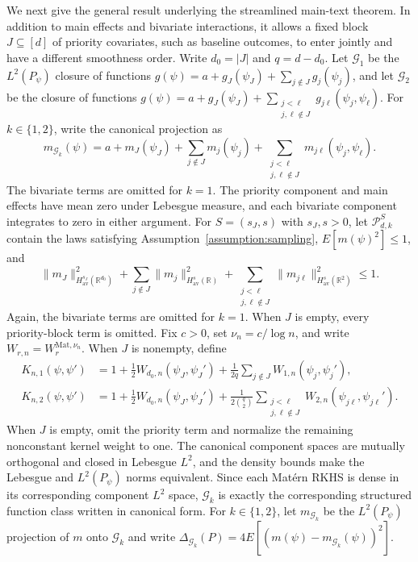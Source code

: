 \documentclass[letterpaper,12pt]{article}
\theoremstyle{definition}
\numberwithin{equation}{section}
\newcommand{\mr}{\mathbb{R}}
\newcommand{\mc}{\mathcal}
\newcommand{\norm}[1]{\lVert#1\rVert}
\begin{document}
We next give the general result underlying the streamlined main-text theorem.
In addition to main effects and bivariate interactions, it allows a fixed block $J\subseteq[d]$ of priority covariates, such as baseline outcomes, to enter jointly and have a different smoothness order.
Write $d_0=|J|$ and $q=d-d_0$.
Let $\mc G_1$ be the $L^2(P_\psi)$ closure of functions $g(\psi)=a+g_J(\psi_J)+\sum_{j\notin J}g_j(\psi_j)$, and let $\mc G_2$ be the closure of functions $g(\psi)=a+g_J(\psi_J)+\sum_{\substack{j<\ell\\j,\ell\notin J}}g_{j\ell}(\psi_j,\psi_\ell)$.
For $k\in\{1,2\}$, write the canonical projection as
\begin{equation}\label{equation:appendix-canonical-low-order-decomposition}
m_{\mc G_k}(\psi)=a+m_J(\psi_J)+\sum_{j\notin J}m_j(\psi_j)+\sum_{\substack{j<\ell\\j,\ell\notin J}}m_{j\ell}(\psi_j,\psi_\ell).
\end{equation}
The bivariate terms are omitted for $k=1$.
The priority component and main effects have mean zero under Lebesgue measure, and each bivariate component integrates to zero in either argument.
For $S=(s_J,s)$ with $s_J,s>0$, let $\mc P_{d,k}^{S}$ contain the laws satisfying Assumption~\ref{assumption:sampling}, $E[m(\psi)^2]\leq1$, and
\begin{equation}\label{equation:appendix-low-order-sobolev-budget}
\norm{m_J}_{H_{\mathrm{av}}^{s_J}(\mr^{d_0})}^2+\sum_{j\notin J}\norm{m_j}_{H_{\mathrm{av}}^s(\mr)}^2+\sum_{\substack{j<\ell\\j,\ell\notin J}}\norm{m_{j\ell}}_{H_{\mathrm{av}}^s(\mr^2)}^2\leq1.
\end{equation}
Again, the bivariate terms are omitted for $k=1$.
When $J$ is empty, every priority-block term is omitted.
Fix $c>0$, set $\nu_n=c/\log n$, and write $W_{r,n}=W_r^{\mathrm{Mat},\nu_n}$.
When $J$ is nonempty, define
\begin{align*}
K_{n,1}(\psi,\psi')&=1+\frac12W_{d_0,n}(\psi_J,\psi_J')+\frac1{2q}\sum_{j\notin J}W_{1,n}(\psi_j,\psi_j'),\\
K_{n,2}(\psi,\psi')&=1+\frac12W_{d_0,n}(\psi_J,\psi_J')+\frac1{2\binom q2}\sum_{\substack{j<\ell\\j,\ell\notin J}}W_{2,n}(\psi_{j\ell},\psi_{j\ell}').
\end{align*}
When $J$ is empty, omit the priority term and normalize the remaining nonconstant kernel weight to one.
The canonical component spaces are mutually orthogonal and closed in Lebesgue $L^2$, and the density bounds make the Lebesgue and $L^2(P_\psi)$ norms equivalent.
Since each Mat\'ern RKHS is dense in its corresponding component $L^2$ space, $\mc G_k$ is exactly the corresponding structured function class written in canonical form.
For $k\in\{1,2\}$, let $m_{\mc G_k}$ be the $L^2(P_\psi)$ projection of $m$ onto $\mc G_k$ and write $\Delta_{\mc G_k}(P)=4E[(m(\psi)-m_{\mc G_k}(\psi))^2]$.
\end{document}
